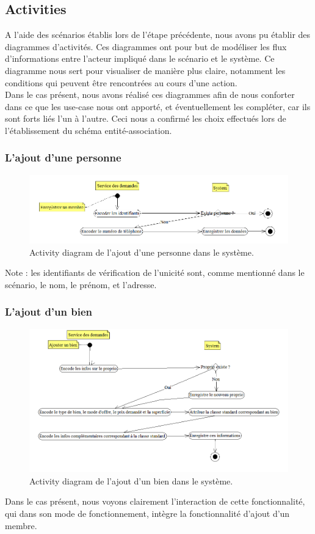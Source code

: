 \newpage
\subsection{Activities}
A l'aide des scénarios établis lors de l'étape précédente, nous avons pu établir des diagrammes d'activités. Ces diagrammes ont pour but de modéliser les flux d'informations entre l'acteur impliqué dans le scénario et le système.
Ce diagramme nous sert pour visualiser de manière plus claire, notamment les conditions qui peuvent être rencontrées au cours d'une action.\\

Dans le cas présent, nous avons réalisé ces diagrammes afin de nous conforter dans ce que les use-case nous ont apporté, et éventuellement les compléter, car ils sont forts liés l'un à l'autre. Ceci nous a confirmé les choix effectués lors de l'établissement du schéma entité-association.

\subsubsection{L'ajout d'une personne}
\begin{figure}[H]
\centering
\includegraphics[width=16cm]{ajoutMembre.png}
\caption{Activity diagram de l'ajout d'une personne dans le système.}
\label{fig:ajoutMembre}
\end{figure}

Note : les identifiants de vérification  de l'unicité sont, comme mentionné dans le scénario, le nom, le prénom, et l'adresse.

\subsubsection{L'ajout d'un bien}
\begin{figure}[H]
\centering
\includegraphics[width=16cm]{ajoutBien.png}
\caption{Activity diagram de l'ajout d'un bien dans le système.}
\label{fig:ajoutBien}
\end{figure}
Dans le cas présent, nous voyons clairement l'interaction de cette fonctionnalité, qui dans son mode de fonctionnement, intègre la fonctionnalité d'ajout d'un membre.

